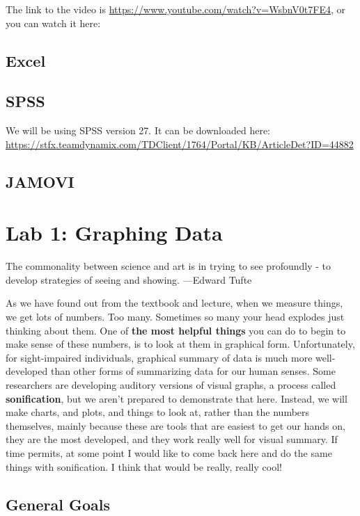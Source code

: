 \documentclass[]{book}
\begin{document}
The link to the video is
\url{https://www.youtube.com/watch?v=WsbnV0t7FE4}, or you can watch it
here:

\section{Excel}\label{excel}

\section{SPSS}\label{spss}

We will be using SPSS version 27. It can be downloaded here:
\url{https://stfx.teamdynamix.com/TDClient/1764/Portal/KB/ArticleDet?ID=44882}

\section{JAMOVI}\label{jamovi}

\chapter{Lab 1: Graphing Data}\label{lab-1-graphing-data}

{ The commonality between science and art is in trying to see profoundly
- to develop strategies of seeing and showing. ---Edward Tufte }

As we have found out from the textbook and lecture, when we measure
things, we get lots of numbers. Too many. Sometimes so many your head
explodes just thinking about them. One of \textbf{the most helpful
things} you can do to begin to make sense of these numbers, is to look
at them in graphical form. Unfortunately, for sight-impaired
individuals, graphical summary of data is much more well-developed than
other forms of summarizing data for our human senses. Some researchers
are developing auditory versions of visual graphs, a process called
\textbf{sonification}, but we aren't prepared to demonstrate that here.
Instead, we will make charts, and plots, and things to look at, rather
than the numbers themselves, mainly because these are tools that are
easiest to get our hands on, they are the most developed, and they work
really well for visual summary. If time permits, at some point I would
like to come back here and do the same things with sonification. I think
that would be really, really cool!

\section{General Goals}\label{general-goals}
\end{document}
